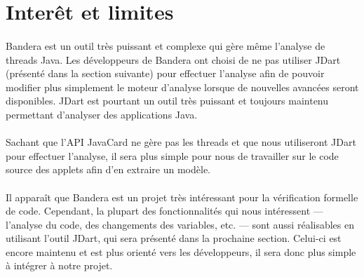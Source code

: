 \section{Interêt et limites}

\paragraph{}
Bandera est un outil très puissant et complexe qui gère même l'analyse
de threads Java. Les développeurs de Bandera ont choisi de ne pas
utiliser JDart (présenté dans la section suivante) pour effectuer
l'analyse afin de pouvoir modifier plus simplement le moteur d'analyse
lorsque de nouvelles avancées seront disponibles. JDart est pourtant
un outil très puissant et toujours maintenu permettant d'analyser des
applications Java.

\paragraph{}
Sachant que l'API JavaCard ne gère pas les threads et que nous
utiliseront JDart pour effectuer l'analyse, il sera plus simple pour
nous de travailler sur le code source des applets afin d'en extraire
un modèle.

\paragraph{}
Il apparaît que Bandera est un projet très intéressant pour la
vérification formelle de code. Cependant, la plupart des
fonctionnalités qui nous intéressent --- l'analyse du code, des
changements des variables, etc. --- sont aussi réalisables en
utilisant l'outil JDart, qui sera présenté dans la prochaine
section. Celui-ci est encore maintenu et est plus orienté vers les
développeurs, il sera donc plus simple à intégrer à notre projet.
